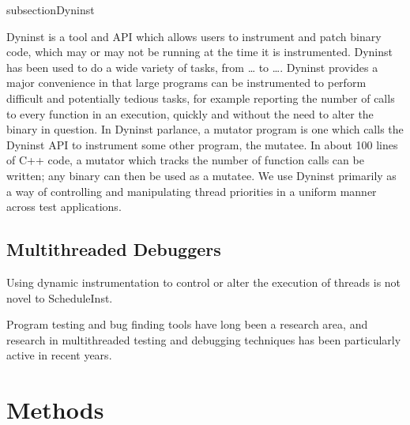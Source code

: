 \documentclass[10pt,]{article} %
\begin{document}
subsection{Dyninst}

Dyninst is a tool and API which allows users to instrument and patch binary code, which may or may not be running at the time it is instrumented.  Dyninst has been used to do a wide variety of tasks, from … to ….  Dyninst provides a major convenience in that large programs can be instrumented to perform difficult and potentially tedious tasks, for example reporting the number of calls to every function in an execution, quickly and without the need to alter the binary in question.  In Dyninst parlance, a mutator program is one which calls the Dyninst API to instrument some other program, the mutatee.   In about 100 lines of C++ code, a mutator which tracks the number of function calls can be written; any binary can then be used as a mutatee.  We use Dyninst primarily as a way of controlling and manipulating thread priorities in a uniform manner across test applications.  


\subsection{Multithreaded Debuggers}

Using dynamic instrumentation to control or alter the execution of threads is not novel to ScheduleInst.  



Program testing and bug finding tools have long been a research area, and research in multithreaded testing and debugging techniques has been particularly active in recent years.  


\section{Methods}
\end{document}

